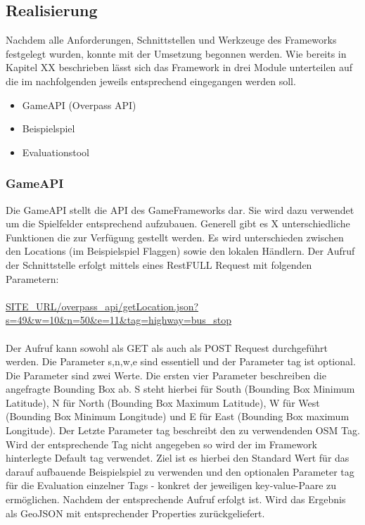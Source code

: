 \subsection*{Realisierung}

Nachdem alle Anforderungen, Schnittstellen und Werkzeuge des Frameworks festgelegt wurden, konnte mit der Umsetzung begonnen werden.
Wie bereits in Kapitel XX beschrieben lässt sich das Framework in drei Module unterteilen auf die im nachfolgenden jeweils entsprechend eingegangen werden soll.

\begin{itemize}

\item GameAPI (Overpass API)
\item Beispielspiel
\item Evaluationstool

\end{itemize}

\subsubsection*{GameAPI}

Die GameAPI stellt die API des GameFrameworks dar. Sie wird dazu verwendet um die Spielfelder entsprechend aufzubauen.
Generell gibt es X unterschiedliche Funktionen die zur Verfügung gestellt werden.
Es wird unterschieden zwischen den Locations (im Beispielspiel Flaggen) sowie den lokalen Händlern.
Der Aufruf der Schnittstelle erfolgt mittels eines RestFULL Request mit folgenden Parametern:
\\\\
\url{SITE\_URL/overpass\_api/getLocation.json?s=49&w=10&n=50&e=11&tag=highway=bus\_stop}
\\\\
Der Aufruf kann sowohl als GET als auch als POST Request durchgeführt werden. Die Parameter s,n,w,e sind essentiell und der Parameter tag ist optional.
Die Parameter sind zwei Werte. Die ersten vier Parameter beschreiben die angefragte Bounding Box ab. S steht hierbei für South (Bounding Box Minimum Latitude), N für North (Bounding Box Maximum Latitude), W für West (Bounding Box Minimum Longitude) und E für East (Bounding Box maximum Longitude). Der Letzte Parameter tag beschreibt den zu verwendenden OSM Tag. Wird der entsprechende Tag nicht angegeben so wird der im Framework hinterlegte Default tag verwendet. Ziel ist es hierbei den Standard Wert für das darauf aufbauende Beispielspiel zu verwenden und den optionalen Parameter tag für die Evaluation einzelner Tags - konkret der jeweiligen key-value-Paare zu ermöglichen. Nachdem der entsprechende Aufruf erfolgt ist. Wird das Ergebnis als GeoJSON mit entsprechender Properties zurückgeliefert.
\\\\ %

